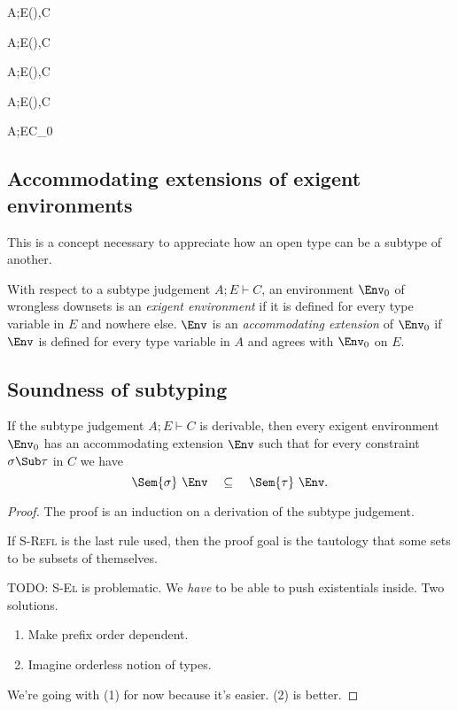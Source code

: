 \documentclass{amsart}
\theoremstyle{definition}
\begin{document}
{A;E\vdash(\All\alpha\sigma)\Sub\tau,C}

{A;E\vdash\sigma\Sub(\Ex\alpha\tau),C}

{A;E\vdash(\Ex\alpha\sigma)\Sub\tau,C}

{A;E\vdash\sigma\Sub(\All\alpha\tau),C}

{A;E\vdash C_0}

\subsection{Accommodating extensions of exigent environments}
This is a concept necessary to appreciate how an open type can be
a subtype of another.

With respect to a subtype judgement $A;E\vdash C$, an environment
$\Env_0$ of wrongless downsets is an \emph{exigent environment}
if it is defined for every type variable in $E$ and nowhere else.
$\Env$ is an \emph{accommodating extension} of $\Env_0$ if $\Env$
is defined for every type variable in $A$ and agrees with
$\Env_0$ on $E$.

\subsection{Soundness of subtyping}
\label{subsound}
If the subtype judgement $A;E\vdash C$ is derivable, then every
exigent environment $\Env_0$ has an accommodating extension
$\Env$ such that for every constraint $\sigma\Sub\tau$ in $C$ we
have
\[
\Sem{\sigma}~\Env \quad \subseteq \quad \Sem{\tau}~\Env.
\]

\begin{proof}
The proof is an induction on a derivation of the subtype
judgement.

If \textsc{S-Refl} is the last rule used, then the proof goal is
the tautology that some sets to be subsets of themselves.

TODO: \textsc{S-El} is problematic. We \emph{have} to be able to
push existentials inside. Two solutions.
\begin{enumerate}
\item Make prefix order dependent.
\item Imagine orderless notion of types.
\end{enumerate}
We're going with (1) for now because it's easier. (2) is better.
\end{proof}
\end{document}
